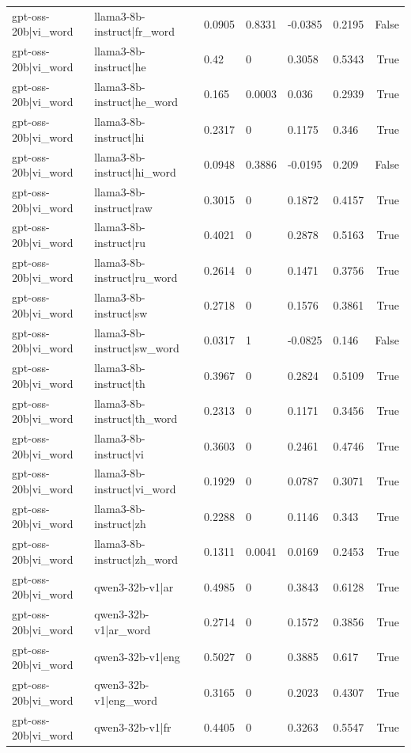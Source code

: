 \begin{table}
\begin{tabular}{llllllr}
gpt-oss-20b|vi_word & llama3-8b-instruct|fr_word & 0.0905 & 0.8331 & -0.0385 & 0.2195 & False \\
gpt-oss-20b|vi_word & llama3-8b-instruct|he & 0.42 & 0 & 0.3058 & 0.5343 & True \\
gpt-oss-20b|vi_word & llama3-8b-instruct|he_word & 0.165 & 0.0003 & 0.036 & 0.2939 & True \\
gpt-oss-20b|vi_word & llama3-8b-instruct|hi & 0.2317 & 0 & 0.1175 & 0.346 & True \\
gpt-oss-20b|vi_word & llama3-8b-instruct|hi_word & 0.0948 & 0.3886 & -0.0195 & 0.209 & False \\
gpt-oss-20b|vi_word & llama3-8b-instruct|raw & 0.3015 & 0 & 0.1872 & 0.4157 & True \\
gpt-oss-20b|vi_word & llama3-8b-instruct|ru & 0.4021 & 0 & 0.2878 & 0.5163 & True \\
gpt-oss-20b|vi_word & llama3-8b-instruct|ru_word & 0.2614 & 0 & 0.1471 & 0.3756 & True \\
gpt-oss-20b|vi_word & llama3-8b-instruct|sw & 0.2718 & 0 & 0.1576 & 0.3861 & True \\
gpt-oss-20b|vi_word & llama3-8b-instruct|sw_word & 0.0317 & 1 & -0.0825 & 0.146 & False \\
gpt-oss-20b|vi_word & llama3-8b-instruct|th & 0.3967 & 0 & 0.2824 & 0.5109 & True \\
gpt-oss-20b|vi_word & llama3-8b-instruct|th_word & 0.2313 & 0 & 0.1171 & 0.3456 & True \\
gpt-oss-20b|vi_word & llama3-8b-instruct|vi & 0.3603 & 0 & 0.2461 & 0.4746 & True \\
gpt-oss-20b|vi_word & llama3-8b-instruct|vi_word & 0.1929 & 0 & 0.0787 & 0.3071 & True \\
gpt-oss-20b|vi_word & llama3-8b-instruct|zh & 0.2288 & 0 & 0.1146 & 0.343 & True \\
gpt-oss-20b|vi_word & llama3-8b-instruct|zh_word & 0.1311 & 0.0041 & 0.0169 & 0.2453 & True \\
gpt-oss-20b|vi_word & qwen3-32b-v1|ar & 0.4985 & 0 & 0.3843 & 0.6128 & True \\
gpt-oss-20b|vi_word & qwen3-32b-v1|ar_word & 0.2714 & 0 & 0.1572 & 0.3856 & True \\
gpt-oss-20b|vi_word & qwen3-32b-v1|eng & 0.5027 & 0 & 0.3885 & 0.617 & True \\
gpt-oss-20b|vi_word & qwen3-32b-v1|eng_word & 0.3165 & 0 & 0.2023 & 0.4307 & True \\
gpt-oss-20b|vi_word & qwen3-32b-v1|fr & 0.4405 & 0 & 0.3263 & 0.5547 & True \\

\end{tabular}
\end{table}
